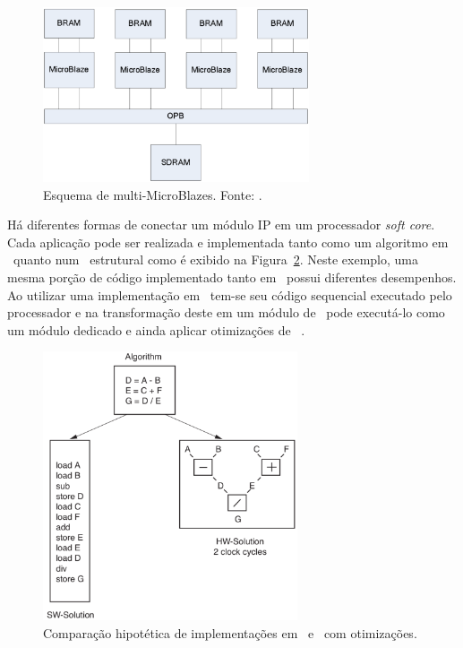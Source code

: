             \begin{figure}[h] \centering
                \includegraphics[width=0.7\textwidth]{img/rb-multi-microblaze.png}
                \caption{Esquema de multi-MicroBlazes. Fonte: \citep{xu2008multi}.}
                \label{fig:rb-multi}
            \end{figure}
            
            
            Há diferentes formas de conectar um módulo IP em um processador \textit{soft core}.
            Cada aplicação pode ser realizada e implementada tanto como um algoritmo em \software\ quanto num \hardware\ estrutural como é exibido na Figura~\ref{fig:rb-mb-hs}.
            Neste exemplo, uma mesma porção de código implementado tanto em \hs\ possui diferentes desempenhos.
            Ao utilizar uma implementação em \software\ tem-se seu código sequencial executado pelo processador e na transformação deste em um módulo de \hardware\ pode executá-lo como um módulo dedicado e ainda aplicar otimizações de \hardware\ \citep{rosinger2004connecting}.
            
            \begin{figure}[h] \centering
                \includegraphics[width=0.67\textwidth]{img/mb-hs.png}
                \caption{Comparação hipotética de implementações em \software\ e \hardware\ com otimizações.}
                \label{fig:rb-mb-hs}
            \end{figure}
            

